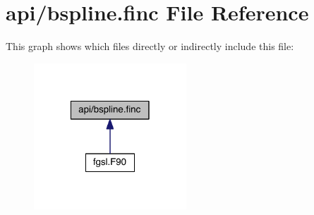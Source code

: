 \hypertarget{bspline_8finc}{\section{api/bspline.finc File Reference}
\label{bspline_8finc}
}
This graph shows which files directly or indirectly include this file\-:\nopagebreak
\begin{figure}[H]
\begin{center}
\leavevmode
\includegraphics[width=162pt]{bspline_8finc__dep__incl}
\end{center}
\end{figure}
